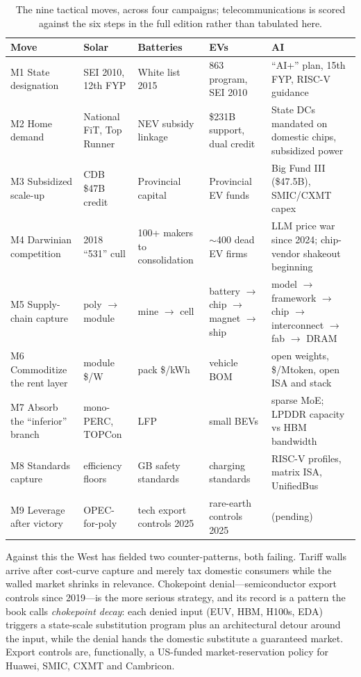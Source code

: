 \begin{table}[htbp]
\centering\footnotesize
\caption{The nine tactical moves, across four campaigns; telecommunications is scored against the six steps in the full edition rather than tabulated here.}
\label{tab:playbook}
\begin{tabular}{@{}p{26mm}p{25mm}p{25mm}p{25mm}p{40mm}@{}}
\toprule
\textbf{Move} & \textbf{Solar} & \textbf{Batteries} & \textbf{EVs} & \textbf{AI} \\
\midrule
M1 State designation & SEI 2010, 12th FYP & White list 2015 & 863 program, SEI 2010 & ``AI+'' plan, 15th FYP, RISC-V guidance \\
M2 Home demand & National FiT, Top Runner & NEV subsidy linkage & \$231B support, dual credit & State DCs mandated on domestic chips, subsidized power \\
M3 Subsidized scale-up & CDB \$47B credit & Provincial capital & Provincial EV funds & Big Fund III (\$47.5B), SMIC/CXMT capex \\
M4 Darwinian competition & 2018 ``531'' cull & 100+ makers to consolidation & $\sim$400 dead EV firms & LLM price war since 2024; chip-vendor shakeout beginning \\
M5 Supply-chain capture & poly $\to$ module & mine $\to$ cell & battery $\to$ chip $\to$ magnet $\to$ ship & model $\to$ framework $\to$ chip $\to$ interconnect $\to$ fab $\to$ DRAM \\
M6 Commoditize the rent layer & module \$/W & pack \$/kWh & vehicle BOM & open weights, \$/Mtoken, open ISA and stack \\
M7 Absorb the ``inferior'' branch & mono-PERC, TOPCon & LFP & small BEVs & sparse MoE; LPDDR capacity vs HBM bandwidth \\
M8 Standards capture & efficiency floors & GB safety standards & charging standards & RISC-V profiles, matrix ISA, UnifiedBus \\
M9 Leverage after victory & OPEC-for-poly & tech export controls 2025 & rare-earth controls 2025 & (pending) \\
\bottomrule
\end{tabular}
\end{table}

Against this the West has fielded two counter-patterns, both failing. Tariff walls arrive after cost-curve capture and merely tax domestic consumers while the walled market shrinks in relevance. Chokepoint denial---semiconductor export controls since 2019---is the more serious strategy, and its record is a pattern the book calls \emph{chokepoint decay}: each denied input (EUV, HBM, H100s, EDA) triggers a state-scale substitution program plus an architectural detour around the input, while the denial hands the domestic substitute a guaranteed market. Export controls are, functionally, a US-funded market-reservation policy for Huawei, SMIC, CXMT and Cambricon.

